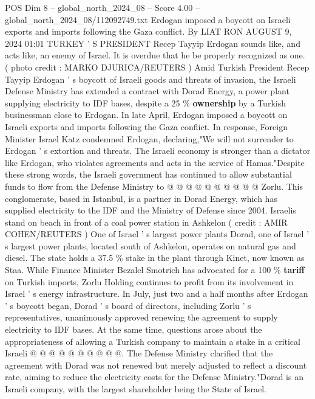 \begin{textsample}{POS Dim 8 – global\_north\_2024\_08 – Score 4.00 – global\_north\_2024\_08/112092749.txt}  \label{ex:f8_pos_324}
Erdogan imposed a boycott on Israeli exports and imports following the Gaza conflict.
By LIAT RON AUGUST 9, 2024 01:01 TURKEY ' S PRESIDENT Recep Tayyip Erdogan sounds like, and acts like, an enemy of Israel.
It is overdue that he be properly recognized as one. ( photo credit : MARKO DJURICA/REUTERS ) Amid Turkish President Recep Tayyip Erdogan ' s boycott of Israeli goods and threats of invasion, the Israeli Defense Ministry has extended a contract with Dorad Energy, a power plant supplying electricity to IDF bases, despite a 25 \% \textbf{ownership} by a Turkish businessman close to Erdogan.
In late April, Erdogan imposed a boycott on Israeli exports and imports following the Gaza conflict.
In response, Foreign Minister Israel Katz condemned Erdogan, declaring,"We will not surrender to Erdogan ' s extortion and threats.
The Israeli economy is stronger than a dictator like Erdogan, who violates agreements and acts in the service of Hamas."Despite these strong words, the Israeli government has continued to allow substantial funds to flow from the Defense Ministry to @ @ @ @ @ @ @ @ @ @ Zorlu.
This conglomerate, based in Istanbul, is a partner in Dorad Energy, which has supplied electricity to the IDF and the Ministry of Defense since 2004.
Israelis stand on beach in front of a coal power station in Ashkelon ( credit : AMIR COHEN/REUTERS ) One of Israel ' s largest power plants Dorad, one of Israel ' s largest power plants, located south of Ashkelon, operates on natural gas and diesel.
The state holds a 37.5 \% stake in the plant through Kinet, now known as Staa.
While Finance Minister Bezalel Smotrich has advocated for a 100 \% \textbf{tariff} on Turkish imports, Zorlu Holding continues to profit from its involvement in Israel ' s energy infrastructure.
In July, just two and a half months after Erdogan ' s boycott began, Dorad ' s board of directors, including Zorlu ' s representatives, unanimously approved renewing the agreement to supply electricity to IDF bases.
At the same time, questions arose about the appropriateness of allowing a Turkish company to maintain a stake in a critical Israeli @ @ @ @ @ @ @ @ @ @.
The Defense Ministry clarified that the agreement with Dorad was not renewed but merely adjusted to reflect a discount rate, aiming to reduce the electricity costs for the Defense Ministry."Dorad is an Israeli company, with the largest shareholder being the State of Israel.

\end{textsample}
